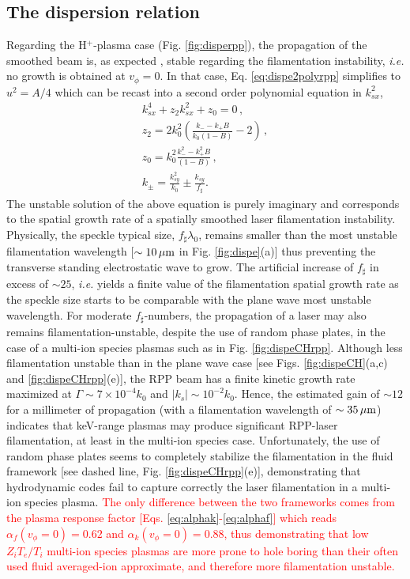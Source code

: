 \documentclass[
 reprint,
 superscriptaddress,
 amsmath,amssymb,
 aps,
]{revtex4-1}
\def\tc{\textcolor{red}}
\begin{document}
\subsection{The dispersion relation}\label{sec:filam}
Regarding the H$^+$-plasma case (Fig. \ref{fig:disperpp}), the propagation of the smoothed beam is, as expected  \cite[]{NatPhys_Glenzer,POP_Berger_98b,PRL_Sarri_2011}, stable regarding the filamentation instability, \emph{i.e.} no growth is obtained  at $v_\phi=0$. In that case, Eq. \eqref{eq:dispe2polyrpp} simplifies to $u^2=A/4$ which can be recast into a second order polynomial equation in $k_{sx}^2$,
\begin{align}
    k_{sx}^4 + z_2 k_{sx}^2 +z_0=0 \, ,\nonumber \\
    z_2 = 2k_0^2\left(  \frac{k_- -k_+ B}{k_0(1-B)} -2  \right)\, , \nonumber\\
    z_0 = k_0^2\frac{k_-^2 -k_+^2 B}{(1-B)}\, ,\nonumber \\
    k_\pm =\frac{k_{sy}^2}{k_0}\pm\frac{k_{sy}}{f_\sharp} .\label{eq:dispefilam}
\end{align}
The unstable solution of the above equation is purely imaginary and corresponds to the spatial growth rate of a spatially smoothed laser filamentation instability.
Physically, the speckle typical size, $f_\sharp\lambda_0$, remains smaller than the most unstable filamentation wavelength [$\sim 10 \,\rm\mu m$ in Fig. \ref{fig:dispe}(a)] thus preventing the transverse standing electrostatic wave to grow. The artificial increase of $f_\sharp$ in excess of $\sim 25$, \emph{i.e.} yields a finite value of the filamentation spatial growth rate as the speckle size starts to be comparable with the plane wave most unstable wavelength. 
For moderate  $f_\sharp$-numbers, the propagation of a laser may  also remains filamentation-unstable, despite the use of random phase plates,  in  the case of a multi-ion species plasmas such as in Fig.   \ref{fig:dispeCHrpp}. 
Although less filamentation unstable than in the plane wave case [see Figs. \ref{fig:dispeCH}(a,c) and \ref{fig:dispeCHrpp}(e)], the RPP beam has a finite kinetic growth rate maximized at  $\Gamma\sim 7\times 10^{-4}k_0 $  and $\vert k_s\vert \sim  10^{-2}k_0$. 
Hence, the estimated  gain of $\sim 12$   for a millimeter of propagation (with a filamentation wavelength of $\sim 35 \,\rm \mu m$) indicates that keV-range plasmas may produce significant RPP-laser filamentation, at least in the multi-ion species case.
Unfortunately, the use of random phase plates seems to completely stabilize the filamentation in the fluid framework [see dashed line, Fig. \ref{fig:dispeCHrpp}(e)], demonstrating that  hydrodynamic codes fail to capture correctly the laser filamentation in a multi-ion species plasma. \tc{The only difference between the two frameworks comes from the plasma response factor [Eqs. \eqref{eq:alphak}-\eqref{eq:alphaf}] which reads $\alpha_{f}(v_\phi=0)=0.62$ and $\alpha_{k}(v_\phi=0)=0.88$, thus demonstrating that low $Z_iT_e/T_i$ multi-ion species plasmas are more prone to hole boring than their often used fluid averaged-ion  approximate, and therefore more filamentation unstable.  } 
\end{document}
